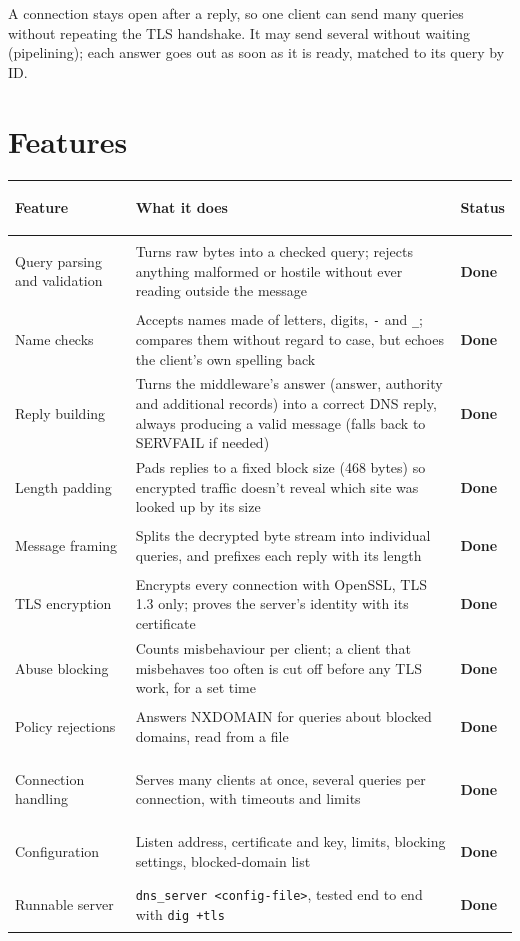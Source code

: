 \documentclass[11pt,a4paper]{article}
\newcommand{\done}{\textcolor{good}{\textbf{Done}}}
\begin{document}
A connection stays open after a reply, so one client can send many queries without repeating
the TLS handshake. It may send several without waiting (pipelining); each answer goes out as soon
as it is ready, matched to its query by ID.

\clearpage
\section{Features}

\begin{tabularx}{\linewidth}{@{}>{\bfseries\raggedright\arraybackslash}p{37mm}X>{\raggedright\arraybackslash}p{19mm}@{}}
\toprule
\normalfont\textbf{Feature} & \textbf{What it does} & \textbf{Status} \\
\midrule
Query parsing and validation & Turns raw bytes into a checked query; rejects anything malformed or
  hostile without ever reading outside the message & \done \\
Name checks & Accepts names made of letters, digits, \texttt{-} and \texttt{\_}; compares them
  without regard to case, but echoes the client's own spelling back & \done \\
Reply building & Turns the middleware's answer (answer, authority and additional records) into a
  correct DNS reply, always producing a valid message (falls back to SERVFAIL if needed) & \done \\
Length padding & Pads replies to a fixed block size (468 bytes) so encrypted traffic doesn't reveal
  which site was looked up by its size & \done \\
Message framing & Splits the decrypted byte stream into individual queries, and prefixes each reply
  with its length & \done \\
TLS encryption & Encrypts every connection with OpenSSL, TLS 1.3 only; proves the server's identity
  with its certificate & \done \\
Abuse blocking & Counts misbehaviour per client; a client that misbehaves too often is cut off
  before any TLS work, for a set time & \done \\
Policy rejections & Answers NXDOMAIN for queries about blocked domains, read from a file & \done \\
Connection handling & Serves many clients at once, several queries per connection, with timeouts
  and limits & \done \\
Configuration & Listen address, certificate and key, limits, blocking settings, blocked-domain
  list & \done \\
Runnable server & \texttt{dns\_server <config-file>}, tested end to end with \texttt{dig +tls} & \done \\
\bottomrule
\end{tabularx}
\end{document}
